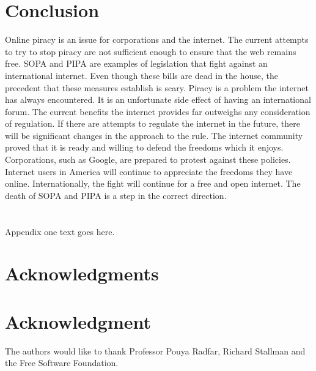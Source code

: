 \documentclass[11pt,journal,compsoc]{IEEEtran}
\begin{document}
\section{Conclusion}
Online piracy is an issue for corporations and the internet. The current attempts to try to stop piracy are not sufficient enough to ensure that the web remains free. SOPA and PIPA are examples of legislation that fight against an international internet. Even though these bills are dead in the house, the precedent that these measures establish is scary. Piracy is a problem the internet has always encountered. It is an unfortunate side effect of having an international forum. The current benefits the internet provides far outweighs any consideration of regulation.  If there are attempts to regulate the internet in the future, there will be significant changes in the approach to the rule. The internet community proved that it is ready and willing to defend the freedoms which it enjoys. Corporations, such as Google, are prepared to protest against these policies. Internet users in America will continue to appreciate the freedoms they have online. Internationally, the fight will continue for a free and open internet. The death of SOPA and PIPA is a step in the correct direction.

\appendices
\section{}
Appendix one text goes here.


\ifCLASSOPTIONcompsoc
  \section*{Acknowledgments}
\else
  \section*{Acknowledgment}
\fi


The authors would like to thank Professor Pouya Radfar, Richard Stallman and the Free Software Foundation.


\ifCLASSOPTIONcaptionsoff
  \newpage
\fi


\end{document}
